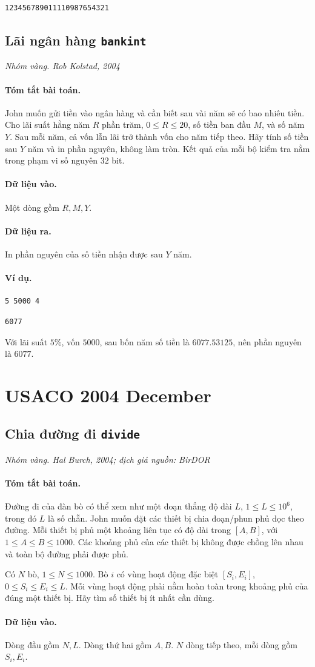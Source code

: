 \documentclass[11pt]{article}
\newcommand{\problem}[4]{%
  \subsection[#1 (#2)]{#1 \hfill {\normalsize\texttt{#2}}}%
  \noindent\textit{#3. #4}\par\smallskip
}
\newcommand{\iosec}[1]{\paragraph{#1}}
\begin{document}
\begin{verbatim}
123456789011110987654321
\end{verbatim}

\problem{Lãi ngân hàng}{bankint}{Nhóm vàng}{Rob Kolstad, 2004}

\iosec{Tóm tắt bài toán.}
John muốn gửi tiền vào ngân hàng và cần biết sau vài năm sẽ có bao nhiêu tiền.
Cho lãi suất hằng năm \(R\) phần trăm, \(0\le R\le 20\), số tiền ban đầu \(M\),
và số năm \(Y\). Sau mỗi năm, cả vốn lẫn lãi trở thành vốn cho năm tiếp theo.
Hãy tính số tiền sau \(Y\) năm và in phần nguyên, không làm tròn. Kết quả của
mỗi bộ kiểm tra nằm trong phạm vi số nguyên \(32\) bit.

\iosec{Dữ liệu vào.}
Một dòng gồm \(R,M,Y\).

\iosec{Dữ liệu ra.}
In phần nguyên của số tiền nhận được sau \(Y\) năm.

\iosec{Ví dụ.}
\begin{verbatim}
5 5000 4
\end{verbatim}

\begin{verbatim}
6077
\end{verbatim}

Với lãi suất \(5\%\), vốn \(5000\), sau bốn năm số tiền là
\(6077.53125\), nên phần nguyên là \(6077\).

\section{USACO 2004 December}

\problem{Chia đường đi}{divide}{Nhóm vàng}{Hal Burch, 2004; dịch giả nguồn: BirDOR}

\iosec{Tóm tắt bài toán.}
Đường đi của đàn bò có thể xem như một đoạn thẳng độ dài \(L\),
\(1\le L\le 10^6\), trong đó \(L\) là số chẵn. John muốn đặt các thiết bị chia
đoạn/phun phủ dọc theo đường. Mỗi thiết bị phủ một khoảng liên tục có độ dài
trong \([A,B]\), với \(1\le A\le B\le 1000\). Các khoảng phủ của các thiết bị
không được chồng lên nhau và toàn bộ đường phải được phủ.

Có \(N\) bò, \(1\le N\le 1000\). Bò \(i\) có vùng hoạt động đặc biệt
\([S_i,E_i]\), \(0\le S_i\le E_i\le L\). Mỗi vùng hoạt động phải nằm hoàn toàn
trong khoảng phủ của đúng một thiết bị. Hãy tìm số thiết bị ít nhất cần dùng.

\iosec{Dữ liệu vào.}
Dòng đầu gồm \(N,L\). Dòng thứ hai gồm \(A,B\). \(N\) dòng tiếp theo, mỗi dòng
gồm \(S_i,E_i\).
\end{document}
